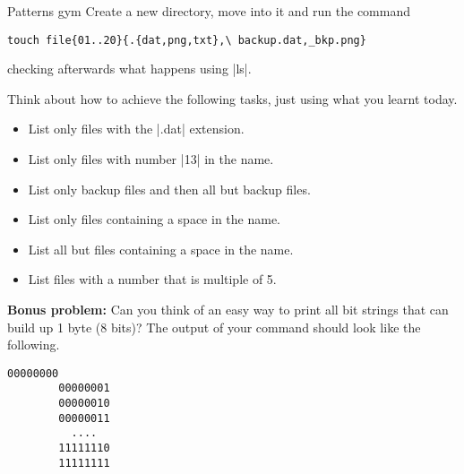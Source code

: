 
\begin{exercise}[Inspirational]{Patterns gym}
    Create a new directory, move into it and run the command
    \begin{lstlisting}[style=MyBash]
        touch file{01..20}{.{dat,png,txt},\ backup.dat,_bkp.png}
    \end{lstlisting}
    checking afterwards what happens using \bash|ls|.

    Think about how to achieve the following tasks, just using what you learnt today.
    \begin{itemize}
        \item List only files with the \bash|.dat| extension.
        \item List only files with number \bash|13| in the name.
        \item List only backup files and then all but backup files.
        \item List only files containing a space in the name.
        \item List all but files containing a space in the name.
        \item List files with a number that is multiple of 5.
    \end{itemize}

    \textbf{Bonus problem:} Can you think of an easy way to print all bit strings that can build up 1 byte (8 bits)?
    The output of your command should look like the following.
    \begin{lstlisting}[style=MyBash]
        00000000
        00000001
        00000010
        00000011
          ....
        11111110
        11111111
    \end{lstlisting}
\end{exercise}